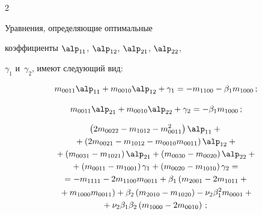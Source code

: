 \begin{multicols}{2}
{Уравнения,  определяющие оптимальные

коэффициенты $\alp_{11}$, $\alp_{12}$, $\alp_{21}$, $\alp_{22}$,

$\gamma_1$ и~$\gamma_2$, имеют следующий вид:

    $$

    m_{0011}\alp_{11} +m_{0010}\alp_{12}+\gamma_1 =- m_{1100}-\beta_1 m_{1000}\,; %

    $$

    $$

    m_{0011}\alp_{21} +m_{0010}\alp_{22}+\gamma_2 =- \beta_1 m_{1000}\,;


    $$



    \vspace*{-10pt}



    \noindent

    \begin{multline*}

        \left(2m_{0022} -m_{1012}- m_{0011}^2\right)\alp_{11}+{}\\

        {}+\left(2m_{0021} -m_{1012}- m_{0010}m_{0011}\right)\alp_{12}+{}\\

{}+ \left(m_{0031} -m_{1021}\right)\alp_{21}+\left(m_{0030} -m_{0020}\right)\alp_{22}+{}\\

{}+\left(m_{0011} -m_{1001}\right)\gamma_1+ \left(m_{0020} -m_{1010}\right)\gamma_2={}\\

{}=- m_{1111} -2m_{1100}m_{0011}+ \beta_1 \left(m_{2001}-2m_{1011}+{}\right.\\

\left.{}+m_{1000} m_{0011}\right)+ \beta_2 \left(m_{2010}-m_{1020}\right) -\nu_2 \beta_1^2 m_{0001} +{}\\

{}+\nu_2 \beta_1\beta_2

    \left(m_{1000}-2m_{0010}\right)\,;\


    \end{multline*}



     \vspace*{-10pt}



}
\end{multicols}
